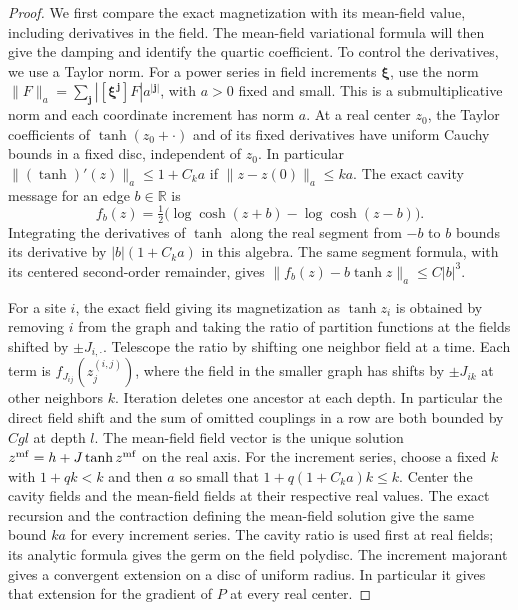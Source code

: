 \documentclass[11pt]{article}
\theoremstyle{definition}
\begin{document}
\begin{proof}
We first compare the exact magnetization with its mean-field value,
including derivatives in the field. The mean-field variational
formula will then give the damping and identify the quartic
coefficient. To control the derivatives, we use a Taylor norm. For a power series in field increments
\(\boldsymbol\xi\), use the norm
\(\|F\|_a=\sum_{\boldsymbol j}|[\boldsymbol\xi^{\boldsymbol j}]F|
a^{|\boldsymbol j|}\), with \(a>0\) fixed and small. This is a
submultiplicative norm and each coordinate increment has norm
\(a\). At a real center \(z_0\), the Taylor coefficients of
\(\tanh(z_0+\cdot)\) and of its fixed derivatives have uniform
Cauchy bounds in a fixed disc, independent of \(z_0\).
In particular \(\|(\tanh)'(z)\|_a\le1+C_k a\) if
\(\|z-z(0)\|_a\le k a\). The exact cavity message for an edge
\(b\in\mathbb R\) is
\begin{equation}
 f_b(z)=\tfrac12\bigl(\log\cosh(z+b)-\log\cosh(z-b)\bigr).
\end{equation}
Integrating the derivatives of \(\tanh\) along the real segment
from \(-b\) to \(b\) bounds its derivative by
\(|b|(1+C_k a)\) in this algebra. The same segment formula,
with its centered second-order remainder, gives
\(\|f_b(z)-b\tanh z\|_a\le C|b|^3\).

For a site \(i\), the exact field giving its magnetization
as \(\tanh z_i\) is obtained by removing \(i\) from the graph
and taking the ratio of partition functions at the fields
shifted by \(\pm J_{i,\cdot}\). Telescope the ratio by shifting
one neighbor field at a time. Each term is
\(f_{J_{ij}}(z_j^{(i,j)})\), where the field in the smaller graph
has shifts by \(\pm J_{ik}\) at other neighbors \(k\).
Iteration deletes one ancestor at each depth. In particular
the direct field shift and the sum of omitted couplings in a
row are both bounded by \(C g l\) at depth \(l\).
The mean-field field vector is the unique solution
\(z^{\rm mf}=h+J\tanh z^{\rm mf}\) on the real axis.
For the increment series, choose a fixed \(k\) with
\(1+qk<k\) and then \(a\) so small that
\(1+q(1+C_k a)k\le k\). Center the cavity fields and the
mean-field fields at their respective real values.
The exact recursion and the contraction defining the mean-field
solution give the same bound \(ka\) for every increment series.
The cavity ratio is used first at real fields; its analytic
formula gives the germ on the field polydisc. The increment
majorant gives a convergent extension on a disc of uniform
radius. In particular it gives that extension for the
gradient of \(P\) at every real center.


\end{proof}
\end{document}
